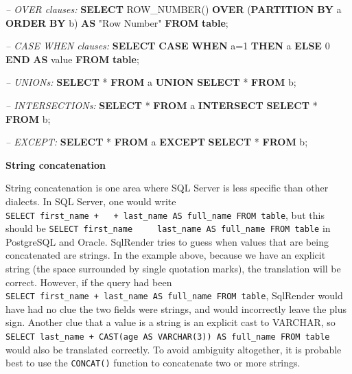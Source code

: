 \documentclass[]{book}
\newenvironment{Shaded}{\begin{snugshade}}{\end{snugshade}}
\newcommand{\KeywordTok}[1]{\textcolor[rgb]{0.13,0.29,0.53}{\textbf{#1}}}
\newcommand{\DecValTok}[1]{\textcolor[rgb]{0.00,0.00,0.81}{#1}}
\newcommand{\CommentTok}[1]{\textcolor[rgb]{0.56,0.35,0.01}{\textit{#1}}}
\newcommand{\OtherTok}[1]{\textcolor[rgb]{0.56,0.35,0.01}{#1}}
\newcommand{\FunctionTok}[1]{\textcolor[rgb]{0.00,0.00,0.00}{#1}}
\newcommand{\NormalTok}[1]{#1}
\begin{document}
\begin{Shaded}
\begin{Highlighting}[]
\CommentTok{-- OVER clauses:}
\KeywordTok{SELECT} \FunctionTok{ROW_NUMBER}\NormalTok{() }\KeywordTok{OVER}\NormalTok{ (}\KeywordTok{PARTITION} \KeywordTok{BY}\NormalTok{ a }\KeywordTok{ORDER} \KeywordTok{BY}\NormalTok{ b)}
  \KeywordTok{AS} \OtherTok{"Row Number"} \KeywordTok{FROM} \KeywordTok{table}\NormalTok{;}
  
\CommentTok{-- CASE WHEN clauses:}
\KeywordTok{SELECT} \KeywordTok{CASE} \KeywordTok{WHEN}\NormalTok{ a=}\DecValTok{1} \KeywordTok{THEN}\NormalTok{ a }\KeywordTok{ELSE} \DecValTok{0} \KeywordTok{END} \KeywordTok{AS} \FunctionTok{value} \KeywordTok{FROM} \KeywordTok{table}\NormalTok{;}

\CommentTok{-- UNIONs:}
\KeywordTok{SELECT}\NormalTok{ * }\KeywordTok{FROM}\NormalTok{ a }\KeywordTok{UNION} \KeywordTok{SELECT}\NormalTok{ * }\KeywordTok{FROM}\NormalTok{ b;}

\CommentTok{-- INTERSECTIONs:}
\KeywordTok{SELECT}\NormalTok{ * }\KeywordTok{FROM}\NormalTok{ a }\KeywordTok{INTERSECT} \KeywordTok{SELECT}\NormalTok{ * }\KeywordTok{FROM}\NormalTok{ b;}

\CommentTok{-- EXCEPT:}
\KeywordTok{SELECT}\NormalTok{ * }\KeywordTok{FROM}\NormalTok{ a }\KeywordTok{EXCEPT} \KeywordTok{SELECT}\NormalTok{ * }\KeywordTok{FROM}\NormalTok{ b;}
\end{Highlighting}
\end{Shaded}

\textbf{String concatenation}

String concatenation is one area where SQL Server is less specific than
other dialects. In SQL Server, one would write
\texttt{SELECT\ first\_name\ +\ \textquotesingle{}\ \textquotesingle{}\ +\ last\_name\ AS\ full\_name\ FROM\ table},
but this should be
\texttt{SELECT\ first\_name\ \textbar{}\textbar{}\ \textquotesingle{}\ \textquotesingle{}\ \textbar{}\textbar{}\ last\_name\ AS\ full\_name\ FROM\ table}
in PostgreSQL and Oracle. SqlRender tries to guess when values that are
being concatenated are strings. In the example above, because we have an
explicit string (the space surrounded by single quotation marks), the
translation will be correct. However, if the query had been
\texttt{SELECT\ first\_name\ +\ last\_name\ AS\ full\_name\ FROM\ table},
SqlRender would have had no clue the two fields were strings, and would
incorrectly leave the plus sign. Another clue that a value is a string
is an explicit cast to VARCHAR, so
\texttt{SELECT\ last\_name\ +\ CAST(age\ AS\ VARCHAR(3))\ AS\ full\_name\ FROM\ table}
would also be translated correctly. To avoid ambiguity altogether, it is
probable best to use the \texttt{CONCAT()} function to concatenate two
or more strings.
\end{document}
